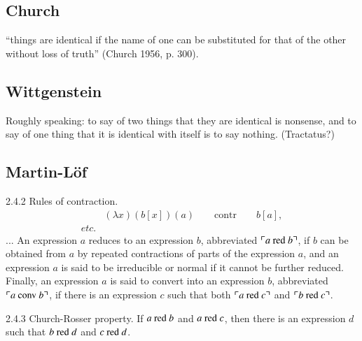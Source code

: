 \subsection{Church}

“things are identical if the name of one can be substituted for
that of the other without loss of truth” (Church 1956, p. 300).

\subsection{Wittgenstein}

Roughly speaking: to say of two things that they are identical is
nonsense, and to say of one thing that it is identical with itself is
to say nothing. (Tractatus?)

\subsection{Martin-Löf}

\begin{displayquote}
  2.4.2 Rules of contraction.
  \begin{align*}
    & (\lambda x)(b[x])(a)\hspace{2em}\text{contr}\hspace{2em} b[a], \\
    etc.
  \end{align*}
  ... An expression \(a\) {\upshape reduces} to an expression \(b\),
  abbreviated \(\ulcorner a\ \text{\upshape red}\ b\urcorner\), if
  \(b\) can be obtained from \(a\) by repeated contractions of parts
  of the expression \(a\), and an expression \(a\) is said to be
  {\upshape irreducible} or {\upshape normal} if it cannot be further
  reduced. Finally, an expression \(a\) is said to {\upshape convert}
  into an expression \(b\), abbreviated \(\ulcorner a\ \text{\upshape
    conv}\ b\urcorner\), if there is an expression \(c\) such that
  both \(\ulcorner a\ \text{\upshape red}\ c\urcorner\) and \(\ulcorner
  b\ \text{\upshape red}\ c\urcorner\).
\end{displayquote}

\vspace{2ex}

\begin{displayquote}
    2.4.3  Church-Rosser property.  If \(a\ \text{\upshape red}\ b\) and \(a\ \text{\upshape red}\ c\), then there is an expression \(d\) such that
    \(b\ \text{\upshape red}\ d\) and \(c\ \text{\upshape red}\ d\).
\end{displayquote}


